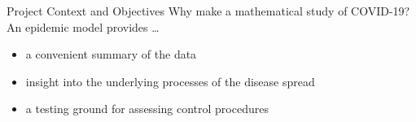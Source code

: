 \begin{slide}{Project Context and Objectives}
	{\large Why make a mathematical study of COVID-19?} \\
	\vspace{1cm}
	An epidemic model provides \dots
	\begin{itemize}
		\item a convenient summary of the data
		\item insight into the underlying processes of the disease spread
		\item a testing ground for assessing control procedures
	\end{itemize}
\end{slide}